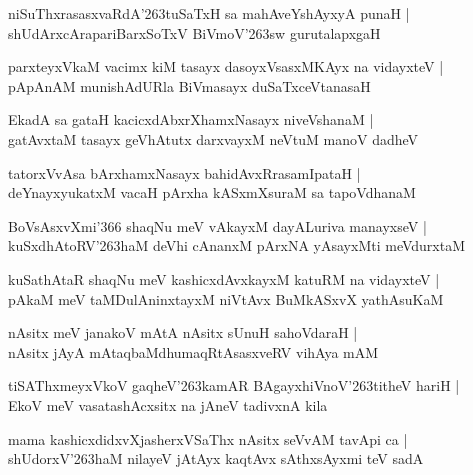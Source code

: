 \begin{shloka}
niSuThxrasasxvaRdA\char'263tuSaTxH sa mahAveYshAyxyA punaH |\\
shUdArxcArapariBarxSoTxV BiVmoV\char'263sw gurutalapxgaH
\end{shloka}

\begin{shloka}
parxteyxVkaM vacimx kiM tasayx dasoyxVsasxMKAyx na vidayxteV |\\
pApAnAM munishAdURla BiVmasayx duSaTxceVtanasaH
\end{shloka}

\begin{shloka}
EkadA sa gataH kacicxdAbxrXhamxNasayx niveVshanaM |\\
gatAvxtaM tasayx geVhAtutx darxvayxM neVtuM manoV dadheV
\end{shloka}

\begin{shloka}
tatorxVvAsa bArxhamxNasayx bahidAvxRrasamIpataH |\\
deYnayxyukatxM vacaH pArxha kASxmXsuraM sa tapoVdhanaM
\end{shloka}

\begin{shloka}
BoVsAsxvXmi\char'366 shaqNu meV vAkayxM dayALuriva manayxseV |\\
kuSxdhAtoRV\char'263haM deVhi cAnanxM pArxNA yAsayxMti meVdurxtaM
\end{shloka}

\begin{shloka}
kuSathAtaR shaqNu meV kashicxdAvxkayxM katuRM na vidayxteV |\\
pAkaM meV taMDulAninxtayxM niVtAvx BuMkASxvX yathAsuKaM
\end{shloka}

\begin{shloka}
nAsitx meV janakoV mAtA nAsitx sUnuH sahoVdaraH |\\
nAsitx jAyA mAtaqbaMdhumaqRtAsasxveRV vihAya mAM
\end{shloka}

\begin{shloka}
tiSAThxmeyxVkoV gaqheV\char'263kamAR BAgayxhiVnoV\char'263titheV hariH |\\
EkoV meV vasatashAcxsitx na jAneV tadivxnA kila
\end{shloka}

\begin{shloka}
mama kashicxdidxvXjasherxVSaThx nAsitx seVvAM tavApi ca |\\
shUdorxV\char'263haM nilayeV jAtAyx kaqtAvx sAthxsAyxmi teV sadA
\end{shloka}

